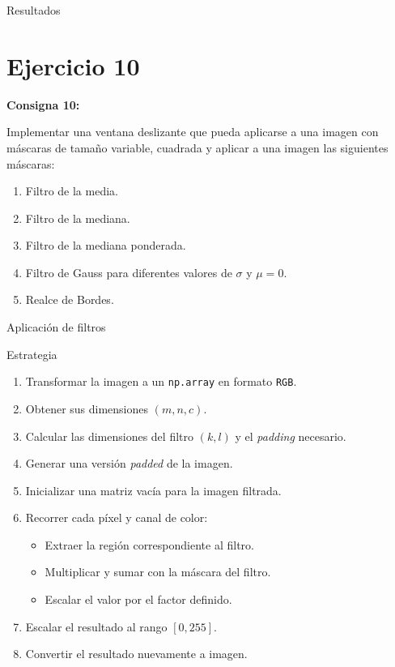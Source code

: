 \documentclass{beamer}
\begin{document}
\begin{frame}[fragile]{Resultados}
\begin{minipage}{0.45\linewidth}
		\label{fig:lenaej9}
	\end{minipage}
\end{frame}

\section{Ejercicio 10}

\begin{frame}
	\begin{center}
		\textcolor{unahurverde}{\textbf{Consigna 10:}}
	\end{center}
	\justifying
	
	Implementar una ventana deslizante que pueda aplicarse a una imagen con máscaras de
	tamaño variable, cuadrada y aplicar a una imagen las siguientes máscaras:

	\begin{enumerate}
		\item Filtro de la media.
		\item Filtro de la mediana.
		\item Filtro de la mediana ponderada.
		\item Filtro de Gauss para diferentes valores de $\sigma$ y $\mu = 0$.
		\item Realce de Bordes.
	\end{enumerate}
\end{frame}

\begin{frame}[fragile]{Aplicación de filtros}
	\justifying
	
	\begin{block}{Estrategia}
		\begin{enumerate}
			\item Transformar la imagen a un \texttt{np.array} en formato \texttt{RGB}.
			\item Obtener sus dimensiones $(m, n, c)$.
			\item Calcular las dimensiones del filtro $(k, l)$ y el \textit{padding} necesario.
			\item Generar una versión \textit{padded} de la imagen.
			\item Inicializar una matriz vacía para la imagen filtrada.
			\item Recorrer cada píxel y canal de color:
			\begin{itemize}
				\item Extraer la región correspondiente al filtro.
				\item Multiplicar y sumar con la máscara del filtro.
				\item Escalar el valor por el factor definido.
			\end{itemize}
			\item Escalar el resultado al rango $[0, 255]$.
			\item Convertir el resultado nuevamente a imagen.
		\end{enumerate}
	\end{block}
\end{frame}
\end{document}

